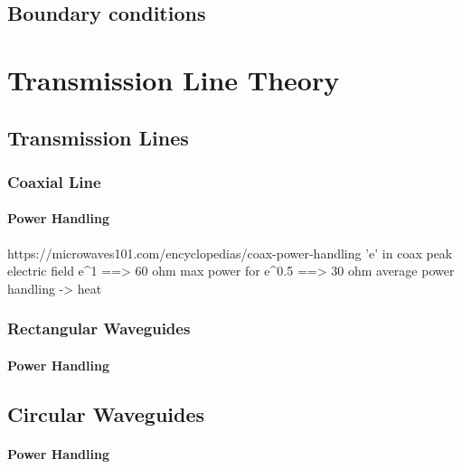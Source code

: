 \subsection{Boundary conditions}

\section{Transmission Line Theory}
\subsection{Transmission Lines}
\subsubsection{Coaxial Line}
\paragraph{Power Handling}
https://microwaves101.com/encyclopedias/coax-power-handling
'e' in coax
peak electric field e^1 ==> 60 ohm
max power for e^0.5 ==> 30 ohm
average power handling -> heat 
\subsubsection{Rectangular Waveguides}
\paragraph{Power Handling}

\subsection{Circular Waveguides}
\paragraph{Power Handling}

